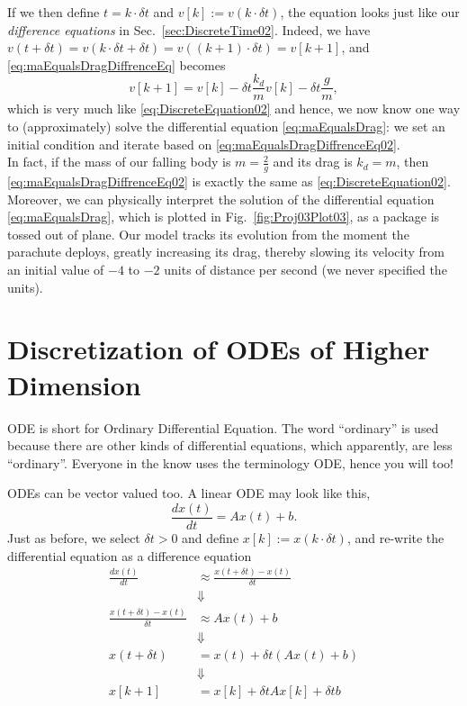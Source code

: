 If we then define $t = k \cdot \delta t$ and $v[k]:=v(k \cdot \delta t)$, the equation looks just like our \textit{difference equations} in Sec.~\ref{sec:DiscreteTime02}. Indeed, we have $v(t+\delta t) = v(k \cdot \delta t +\delta t) =  v((k+1)\cdot \delta t)=v[k+1]$, and \eqref{eq:maEqualsDragDiffrenceEq} becomes
\begin{equation}
\label{eq:maEqualsDragDiffrenceEq02}
v[k+1]  = v[k] - \delta t \frac{k_d}{m} v[k] - \delta t \frac{g}{m},
\end{equation}
which is very much like \eqref{eq:DiscreteEquation02} and hence, we now know one way to (approximately) solve the differential equation \eqref{eq:maEqualsDrag}: we set an initial condition and iterate based on \eqref{eq:maEqualsDragDiffrenceEq02}. \\

In fact, if the mass of our falling body is $m=\frac{2}{g}$ and its drag is $k_d=m$, then \eqref{eq:maEqualsDragDiffrenceEq02} is exactly the same as \eqref{eq:DiscreteEquation02}. Moreover, we can physically interpret the solution of the differential equation \eqref{eq:maEqualsDrag}, which is plotted in Fig.~\ref{fig:Proj03Plot03}, as a package is tossed out of plane. Our model tracks its evolution from the moment the parachute deploys, greatly increasing its drag, thereby slowing its velocity from an initial value of $-4$ to $-2$ units of distance per second (we never specified the units).

\section{Discretization of ODEs of Higher Dimension}

\vspace*{0.5cm}
\begin{tcolorbox}[sharp corners, colback=green!30, colframe=green!80!blue, title=\textbf{\large ODE}]
ODE is short for Ordinary Differential Equation. The word ``ordinary'' is used because there are other kinds of differential equations, which apparently, are less ``ordinary''. Everyone in the know uses the terminology ODE, hence you will too!
\end{tcolorbox}


ODEs can be vector valued too. A linear ODE may look like this,
$$\frac{dx(t)}{dt} = Ax(t) + b. $$
Just as before, we select $\delta t>0$ and define $x[k]:=x(k \cdot \delta t)$, and re-write the differential equation as a difference equation
\begin{align*}
    \frac{dx(t)}{dt} &\approx \frac{x(t+\delta t) - x(t)}{\delta t} \\
    &\Downarrow \\
 \frac{x(t+\delta t) - x(t)}{\delta t} & \approx Ax(t) + b\\
    &\Downarrow \\
   x(t+\delta t) &= x(t) + \delta t \left( Ax(t) + b \right)\\
   &\Downarrow \\
   x[k+1] & = x[k] + \delta t A x[k] + \delta t b
\end{align*}

